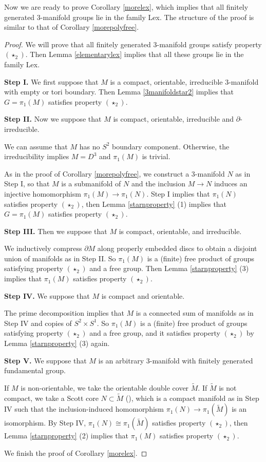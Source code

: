 \documentclass{amsart}
\numberwithin{equation}{section}
\theoremstyle{definition}
\begin{document}
Now we are ready to prove Corollary \ref{morelex}, which implies that all finitely generated $3$-manifold groups lie in the family Lex. The structure of the proof is similar to that of Corollary \ref{morepolyfree}.
\begin{proof}

We will prove that all finitely generated $3$-manifold groups satisfy property $(\star_2)$. Then Lemma \ref{elementarylex} implies that all these groups lie in the family Lex.

{\bf Step I.} We first suppose that $M$ is a compact, orientable, irreducible $3$-manifold with empty or tori boundary. Then Lemma \ref{3manifoldstar2} implies that $G=\pi_1(M)$ satisfies property $(\star_2)$.

{\bf Step II.} Now we suppose that $M$ is compact, orientable, irreducible and $\partial$-irreducible. 

We can assume that $M$ has no $S^2$ boundary component. Otherwise, the irreducibility implies $M=D^3$ and $\pi_1(M)$ is trivial.

As in the proof of Corollary \ref{morepolyfree}, we construct a $3$-manifold $N$ as in Step I, so that $M$ is a submanifold of $N$ and the inclusion $M\to N$ induces an injective homomorphism $\pi_1(M)\to \pi_1(N)$. Step I implies that $\pi_1(N)$ satisfies property $(\star_2)$, then Lemma \ref{starnproperty} (1) implies that $G=\pi_1(M)$ satisfies property $(\star_2)$.

{\bf Step III.} Then we suppose that $M$ is compact, orientable, and irreducible. 

We inductively compress $\partial M$ along properly embedded discs to obtain a disjoint union of manifolds as in Step II. So $\pi_1(M)$ is a (finite) free product of groups satisfying property $(\star_2)$ and a free group. Then Lemma \ref{starnproperty} (3) implies that $\pi_1(M)$ satisfies property $(\star_2)$.

{\bf Step IV.} We suppose that $M$ is compact and orientable.

The prime decomposition implies that $M$ is a connected sum of manifolds as in Step IV and copies of $S^2\times S^1$. So $\pi_1(M)$ is a (finite) free product of groups satisfying property $(\star_2)$ and a free group, and it satisfies property $(\star_2)$ by Lemma \ref{starnproperty} (3) again.

{\bf Step V.} We suppose that $M$ is an arbitrary $3$-manifold with finitely generated fundamental group. 

If $M$ is non-orientable, we take the orientable double cover $\tilde{M}$. If $\tilde{M}$ is not compact, we take a Scott core $N\subset \tilde{M}$ (\cite{Sco}), which is a compact manifold as in Step IV such that the inclusion-induced homomorphism $\pi_1(N)\to \pi_1(\tilde{M})$ is an isomorphism. By Step IV, $\pi_1(N)\cong \pi_1(\tilde{M})$ satisfies property $(\star_2)$, then Lemma \ref{starnproperty} (2) implies that $\pi_1(M)$ satisfies property $(\star_2)$.

We finish the proof of Corollary \ref{morelex}.
\end{proof}
\end{document}
